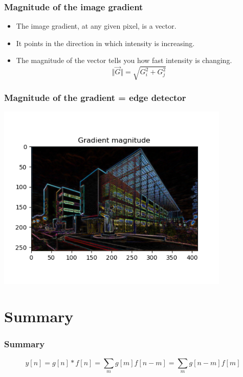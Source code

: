 \documentclass{beamer}
\begin{document}
\begin{frame}
  \frametitle{Magnitude of the image gradient}
  \begin{itemize}
  \item
    The image gradient, at any given pixel, is a vector.
  \item
    It points in the direction in which intensity is increasing.
  \item
    The magnitude of the vector tells you how fast intensity is
    changing.
    \[
    \Vert \vec{G}\Vert =\sqrt{G_i^2 + G_j^2}
    \]
  \end{itemize}
\end{frame}
    
\begin{frame}
  \frametitle{Magnitude of the gradient = edge detector}
      
  \centerline{\includegraphics[height=3.5in]{mp3fig9.png}}
\end{frame}

\section[Summary]{Summary}
\setcounter{subsection}{1}
\begin{frame}
  \frametitle{Summary}

    \[
    y[n] = g[n]\ast f[n] = \sum_m g[m] f[n-m] = \sum_m g[n-m] f[m]
    \]
\end{frame}
\end{document}
